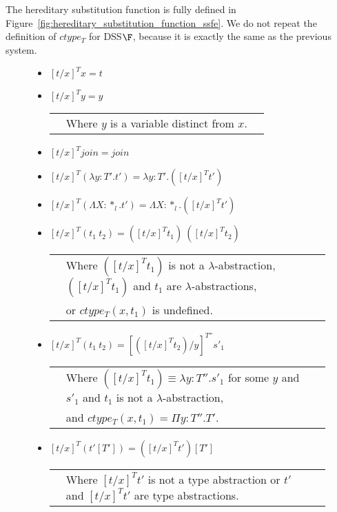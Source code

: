 The hereditary substitution function is fully defined in
Figure~\ref{fig:hereditary_substitution_function_ssfe}.  We do not
repeat the definition of $ctype_T$ for DSS$\F$, because it is
exactly the same as the previous system. 
\begin{figure}[t]
  \small
  \begin{itemize}
  \item[] $[t/x]^T x = t$

  \item[] $[t/x]^T y = y$\\
    \begin{tabular}{lll}
      & Where $y$ is a variable distinct from $x$.\\
    \end{tabular}

  \item[] $[t/x]^T join = join$

  \item[] $[t/x]^T (\lambda y:T'.t') = \lambda y:T'.([t/x]^T t')$

  \item[] $[t/x]^T (\Lambda X:*_l.t') = \Lambda X:*_l.([t/x]^T t')$

  \item[] $[t/x]^T (t_1\ t_2) = ([t/x]^T t_1)\ ([t/x]^T t_2)$\\
    \begin{tabular}{lll}
      & Where $([t/x]^T t_1)$ is not a $\lambda$-abstraction, 
      $([t/x]^T t_1)$ and $t_1$ are $\lambda$-abstractions,\\ 
      & or $ctype_T(x,t_1)$ is undefined.
    \end{tabular}

  \item[] $[t/x]^{T} (t_1\ t_2) = [([t/x]^{T} t_2)/y]^{T''} s'_1$\\
    \begin{tabular}{lll}
      & Where $([t/x]^{T} t_1) \equiv \lambda y:T''.s'_1$ 
        for some $y$ and $s'_1$ and $t_1$ is not a $\lambda$-abstraction, \\ 
      & and $ctype_T(x,t_1) = \Pi y:T''.T'$.\\
    \end{tabular}

  \item[] $[t/x]^T (t'[T']) = ([t/x]^T t')[T']$\\
    \begin{tabular}{lll}
      & Where $[t/x]^T t'$ is not a type abstraction or
      $t'$ and $[t/x]^T t'$ are type abstractions.
    \end{tabular}


\end{itemize}
\end{figure}
